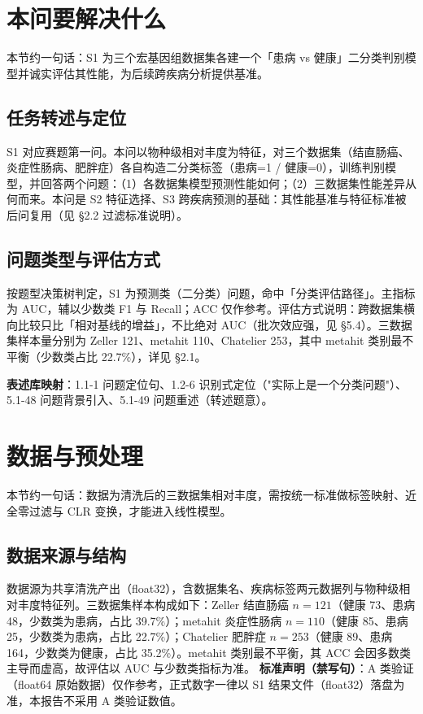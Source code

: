 \documentclass{internal-report}
\begin{document}
\section{本问要解决什么}
\label{sec:intro}

本节约一句话：S1 为三个宏基因组数据集各建一个「患病 vs 健康」二分类判别模型并诚实评估其性能，为后续跨疾病分析提供基准。

\subsection{任务转述与定位}
S1 对应赛题第一问。本问以物种级相对丰度为特征，对三个数据集（结直肠癌、炎症性肠病、肥胖症）各自构造二分类标签（患病=1 / 健康=0），训练判别模型，并回答两个问题：（1）各数据集模型预测性能如何；（2）三数据集性能差异从何而来。本问是 S2 特征选择、S3 跨疾病预测的基础：其性能基准与特征标准被后问复用（见 §2.2 过滤标准说明）。

\subsection{问题类型与评估方式}
按题型决策树判定，S1 为预测类（二分类）问题，命中「分类评估路径」。主指标为 AUC，辅以少数类 F1 与 Recall；ACC 仅作参考。评估方式说明：跨数据集横向比较只比「相对基线的增益」，不比绝对 AUC（批次效应强，见 §5.4）。三数据集样本量分别为 Zeller 121、metahit 110、Chatelier 253，其中 metahit 类别最不平衡（少数类占比 22.7\%），详见 §2.1。

\textbf{表述库映射}：1.1-1 问题定位句、1.2-6 识别式定位（"实际上是一个分类问题"）、5.1-48 问题背景引入、5.1-49 问题重述（转述题意）。

\section{数据与预处理}
\label{sec:data}

本节约一句话：数据为清洗后的三数据集相对丰度，需按统一标准做标签映射、近全零过滤与 CLR 变换，才能进入线性模型。

\subsection{数据来源与结构}
数据源为共享清洗产出（float32），含数据集名、疾病标签两元数据列与物种级相对丰度特征列。三数据集样本构成如下：Zeller 结直肠癌 $n=121$（健康 73、患病 48，少数类为患病，占比 39.7\%）；metahit 炎症性肠病 $n=110$（健康 85、患病 25，少数类为患病，占比 22.7\%）；Chatelier 肥胖症 $n=253$（健康 89、患病 164，少数类为健康，占比 35.2\%）。metahit 类别最不平衡，其 ACC 会因多数类主导而虚高，故评估以 AUC 与少数类指标为准。
\textbf{标准声明（禁写句）}：A 类验证（float64 原始数据）仅作参考，正式数字一律以 S1 结果文件（float32）落盘为准，本报告不采用 A 类验证数值。
\end{document}
